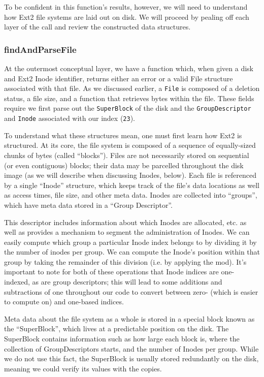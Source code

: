 \documentclass[nocopyrightspace]{sigplanconf}
\begin{document}
To be confident in this function's results, however, we will need to
understand how Ext2 file systems are laid out on disk. We will proceed by
pealing off each layer of the call and review the constructed data structures.

\subsubsection{findAndParseFile}

At the outermost conceptual layer, we have a function which, when given a disk
and Ext2 Inode identifier, returns either an error or a valid File structure
associated with that file. As we discussed earlier, a {\tt File} is composed
of a deletion status, a file size, and a function that retrieves bytes within
the file. These fields require we first parse out the {\tt SuperBlock} of the
disk and the {\tt GroupDescriptor} and {\tt Inode} associated with our index
({\tt 23}).

To understand what these structures mean, one must first learn how Ext2 is
structured. At its core, the file system is composed of a sequence of
equally-sized chunks of bytes (called ``blocks''). Files are not necessarily
stored on sequential (or even contiguous) blocks; their data may be parcelled
throughout the disk image (as we will describe when discussing Inodes, below).
Each file is referenced by a single ``Inode'' structure, which keeps track of
the file's data locations as well as access times, file size, and other meta
data. Inodes are collected into ``groups'', which have meta data stored in a
``Group Descriptor''. 

This descriptor includes information about which Inodes are allocated, etc. as
well as provides a mechanism to segment the administration of Inodes. We can
easily compute which group a particular Inode index belongs to by dividing it
by the number of inodes per group. We can compute the Inode's position within
that group by taking the remainder of this division (i.e. by applying the
mod). It's important to note for both of these operations that Inode indices
are one-indexed, as are group descriptors; this will lead to some additions
and subtractions of one throughout our code to convert between zero- (which is
easier to compute on) and one-based indices.

Meta data about the file system as a whole is stored in a special block known
as the ``SuperBlock'', which lives at a predictable position on the disk. The
SuperBlock contains information such as how large each block is, where the
collection of GroupDescriptors starts, and the number of Inodes per group.
While we do not use this fact, the SuperBlock is usually stored redundantly on
the disk, meaning we could verify its values with the copies.
\end{document}
